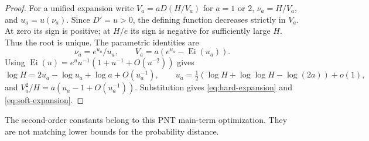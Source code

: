 \begin{proof}
For a unified expansion write $V_a=aD(H/V_a)$ for $a=1$ or $2$,
$\nu_a=H/V_a$, and $u_a=u(\nu_a)$. Since $D'=u>0$, the defining
function decreases strictly in $V_a$. At zero its sign is positive;
at $H/e$ its sign is negative for sufficiently large $H$. Thus the root
is unique. The parametric identities are
\[
 \nu_a=e^{u_a}/u_a,\qquad
 V_a=a(e^{u_a}-\operatorname{Ei}(u_a)).
\]
Using $\operatorname{Ei}(u)=e^u u^{-1}(1+u^{-1}+O(u^{-2}))$ gives
\[
 \log H=2u_a-\log u_a+\log a+O(u_a^{-1}),\qquad
 u_a=\tfrac12(\log H+\log\log H-\log(2a))+o(1),
\]
and $V_a^2/H=a(u_a-1+O(u_a^{-1}))$. Substitution gives
\eqref{eq:hard-expansion} and \eqref{eq:soft-expansion}.
\end{proof}
The second-order constants belong to this PNT main-term optimization.
They are not matching lower bounds for the probability distance.

